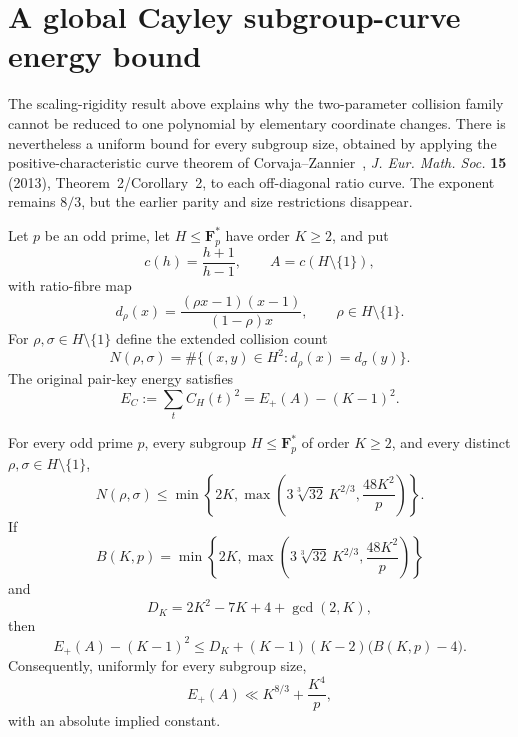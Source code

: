 \section{A global Cayley subgroup-curve energy bound}
\label{sec:cayley-curve-uniform}
The scaling-rigidity result above explains why the two-parameter collision
family cannot be reduced to one polynomial by elementary coordinate changes.
There is nevertheless a uniform bound for every subgroup size, obtained by
applying the positive-characteristic curve theorem of Corvaja--Zannier~\cite{CorvajaZannier2013},
\emph{J. Eur. Math. Soc.} \textbf{15} (2013), Theorem~2/Corollary~2,
to each off-diagonal ratio curve.  The exponent remains
$8/3$, but the earlier parity and size restrictions disappear.

Let $p$ be an odd prime, let $H\leq\mathbf F_p^*$ have order $K\geq2$, and put
\[
 c(h)=\frac{h+1}{h-1},\qquad A=c(H\setminus\{1\}),
\]
with ratio-fibre map
\[
 d_\rho(x)=\frac{(\rho x-1)(x-1)}{(1-\rho)x},
 \qquad \rho\in H\setminus\{1\}.
\]
For $\rho,\sigma\in H\setminus\{1\}$ define the extended collision count
\[
 N(\rho,\sigma)=\#\{(x,y)\in H^2:d_\rho(x)=d_\sigma(y)\}.
\]
The original pair-key energy satisfies
\begin{equation}\label{eq:czu-ec}
 E_C:=\sum_t C_H(t)^2=E_+(A)-(K-1)^2.
\end{equation}

\begin{theorem}\label{thm:czu-cayley}
For every odd prime $p$, every subgroup $H\leq\mathbf F_p^*$ of order
$K\geq2$, and every distinct $\rho,\sigma\in H\setminus\{1\}$,
\begin{equation}\label{eq:czu-point}
 N(\rho,\sigma)\leq
 \min\!\left\{2K,
 \max\!\left(3\sqrt[3]{32}\,K^{2/3},\frac{48K^2}{p}\right)\right\}.
\end{equation}
If
\[
 B(K,p)=\min\!\left\{2K,
 \max\!\left(3\sqrt[3]{32}\,K^{2/3},\frac{48K^2}{p}\right)\right\}
\]
and
\[
 D_K=2K^2-7K+4+\gcd(2,K),
\]
then
\begin{equation}\label{eq:czu-energy-exact}
 E_+(A)-(K-1)^2
 \leq D_K+(K-1)(K-2)\bigl(B(K,p)-4\bigr).
\end{equation}
Consequently, uniformly for every subgroup size,
\begin{equation}\label{eq:czu-energy-asymp}
 E_+(A)\ll K^{8/3}+\frac{K^4}{p},
\end{equation}
with an absolute implied constant.
\end{theorem}

